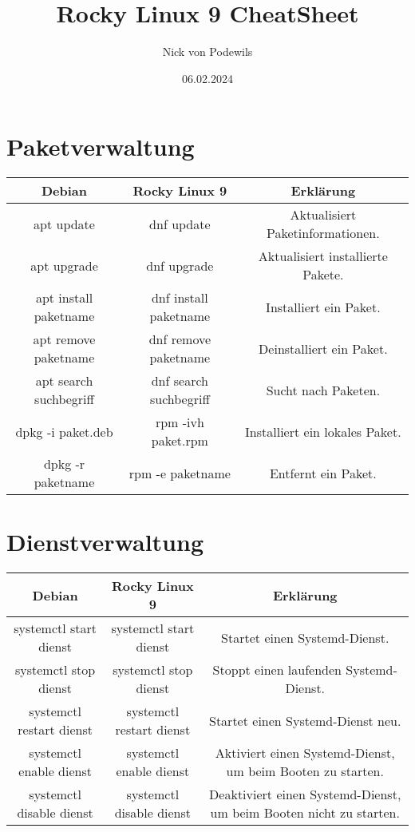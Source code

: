 \documentclass{article}
\begin{document}
\title{Rocky Linux 9 CheatSheet}
\author{Nick von Podewils}
\date{06.02.2024}
\maketitle

\section*{Paketverwaltung}

\begin{tabularx}{\textwidth}{CCC}
  \textbf{Debian} & \textbf{Rocky Linux 9} & \textbf{Erklärung} \\
  \hline
  apt update & dnf update & Aktualisiert Paketinformationen. \\
  apt upgrade & dnf upgrade & Aktualisiert installierte Pakete. \\
  apt install paketname & dnf install paketname & Installiert ein Paket. \\
  apt remove paketname & dnf remove paketname & Deinstalliert ein Paket. \\
  apt search suchbegriff & dnf search suchbegriff & Sucht nach Paketen. \\
  dpkg -i paket.deb & rpm -ivh paket.rpm & Installiert ein lokales Paket. \\
  dpkg -r paketname & rpm -e paketname & Entfernt ein Paket. \\
\end{tabularx}


\section*{Dienstverwaltung}

\begin{tabularx}{\textwidth}{CCC}
  \textbf{Debian} & \textbf{Rocky Linux 9} & \textbf{Erklärung} \\
  \hline
  systemctl start dienst & systemctl start dienst & Startet einen Systemd-Dienst. \\
  systemctl stop dienst & systemctl stop dienst & Stoppt einen laufenden Systemd-Dienst. \\
  systemctl restart dienst & systemctl restart dienst & Startet einen Systemd-Dienst neu. \\
  systemctl enable dienst & systemctl enable dienst & Aktiviert einen Systemd-Dienst, um beim Booten zu starten. \\
  systemctl disable dienst & systemctl disable dienst & Deaktiviert einen Systemd-Dienst, um beim Booten nicht zu starten. \\
\end{tabularx}
\end{document}
